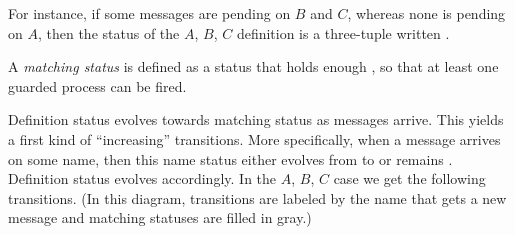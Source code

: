For instance, if some messages are pending on $B$ and $C$, whereas
none is pending on $A$, then the status of the $A$, $B$, $C$
definition is a three-tuple written .

A {\em matching status} is defined as a status that holds enough
, so that at least one guarded process can be fired.

Definition status evolves towards matching status as messages arrive.
This yields a first kind of ``increasing'' transitions.  More
specifically, when a message arrives on some name, then this name
status either evolves from  to  or remains
.  Definition status evolves accordingly.  In the $A$, $B$,
$C$ case we get the following transitions.  (In this diagram,
transitions are labeled by the name that gets a new message and
matching statuses are filled in gray.)
